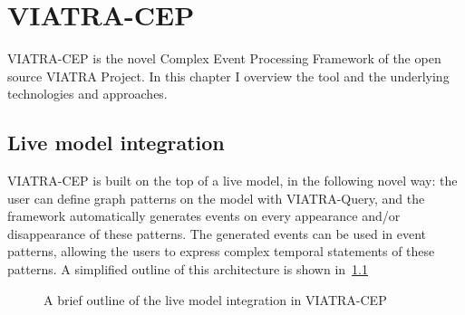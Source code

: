 \chapter{VIATRA-CEP}
\label{chap:viatra_cep}
VIATRA-CEP\citep{CEP}\citep{davidi} is the novel Complex Event Processing Framework of the open source VIATRA Project.
In this chapter I overview the tool and the underlying technologies and approaches.

\section{Live model integration}
VIATRA-CEP is built on the top of a live model, in the following novel way:
the user can define graph patterns on the model with VIATRA-Query, and the framework
automatically generates events on every appearance and/or disappearance of these patterns.
The generated events can be used in event patterns, allowing the users to express complex
temporal statements of these patterns. A simplified outline of this architecture is shown in~\cref{fig:viatracep:oldinputs}



\begin{figure}[h]
\noindent
{}
	\caption{A brief outline of the live model integration in VIATRA-CEP}
	\label{fig:viatracep:oldinputs}
\end{figure}%


